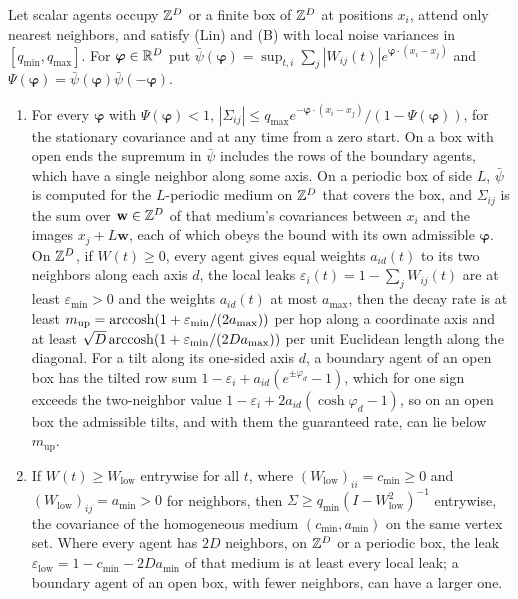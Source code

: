 \begin{proposition}\label{prop:sca-heterogeneous}
Let scalar agents occupy $\mathbb{Z}^D$ or a finite box of $\mathbb{Z}^D$ at positions $x_i$, attend only nearest neighbors, and satisfy \textup{(Lin)} and \textup{(B)} with local noise variances in $[q_{\min},q_{\max}]$. For $\boldsymbol\varphi\in\mathbb{R}^D$ put $\bar\psi(\boldsymbol\varphi)=\sup_{t,i}\sum_j|W_{ij}(t)|e^{\boldsymbol\varphi\cdot(x_i-x_j)}$ and $\Psi(\boldsymbol\varphi)=\bar\psi(\boldsymbol\varphi)\bar\psi(-\boldsymbol\varphi)$.
\begin{enumerate}
\item[(a)] For every $\boldsymbol\varphi$ with $\Psi(\boldsymbol\varphi)<1$, $|\Sigma_{ij}|\le q_{\max}e^{-\boldsymbol\varphi\cdot(x_i-x_j)}/(1-\Psi(\boldsymbol\varphi))$, for the stationary covariance and at any time from a zero start. On a box with open ends the supremum in $\bar\psi$ includes the rows of the boundary agents, which have a single neighbor along some axis. On a periodic box of side $L$, $\bar\psi$ is computed for the $L$-periodic medium on $\mathbb{Z}^D$ that covers the box, and $\Sigma_{ij}$ is the sum over $\mathbf w\in\mathbb{Z}^D$ of that medium's covariances between $x_i$ and the images $x_j+L\mathbf w$, each of which obeys the bound with its own admissible $\boldsymbol\varphi$. On $\mathbb{Z}^D$, if $W(t)\ge0$, every agent gives equal weights $a_{id}(t)$ to its two neighbors along each axis $d$, the local leaks $\varepsilon_i(t)=1-\sum_jW_{ij}(t)$ are at least $\varepsilon_{\min}>0$ and the weights $a_{id}(t)$ at most $a_{\max}$, then the decay rate is at least $m_{\mathrm{up}}=\operatorname{arccosh}(1+\varepsilon_{\min}/(2a_{\max}))$ per hop along a coordinate axis and at least $\sqrt D\operatorname{arccosh}(1+\varepsilon_{\min}/(2Da_{\max}))$ per unit Euclidean length along the diagonal. For a tilt along its one-sided axis $d$, a boundary agent of an open box has the tilted row sum $1-\varepsilon_i+a_{id}(e^{\pm\varphi_d}-1)$, which for one sign exceeds the two-neighbor value $1-\varepsilon_i+2a_{id}(\cosh\varphi_d-1)$, so on an open box the admissible tilts, and with them the guaranteed rate, can lie below $m_{\mathrm{up}}$.
\item[(b)] If $W(t)\ge W_{\mathrm{low}}$ entrywise for all $t$, where $(W_{\mathrm{low}})_{ii}=c_{\min}\ge0$ and $(W_{\mathrm{low}})_{ij}=a_{\min}>0$ for neighbors, then $\Sigma\ge q_{\min}(I-W_{\mathrm{low}}^2)^{-1}$ entrywise, the covariance of the homogeneous medium $(c_{\min},a_{\min})$ on the same vertex set. Where every agent has $2D$ neighbors, on $\mathbb{Z}^D$ or a periodic box, the leak $\varepsilon_{\mathrm{low}}=1-c_{\min}-2Da_{\min}$ of that medium is at least every local leak; a boundary agent of an open box, with fewer neighbors, can have a larger one.

\end{enumerate}
\end{proposition}
